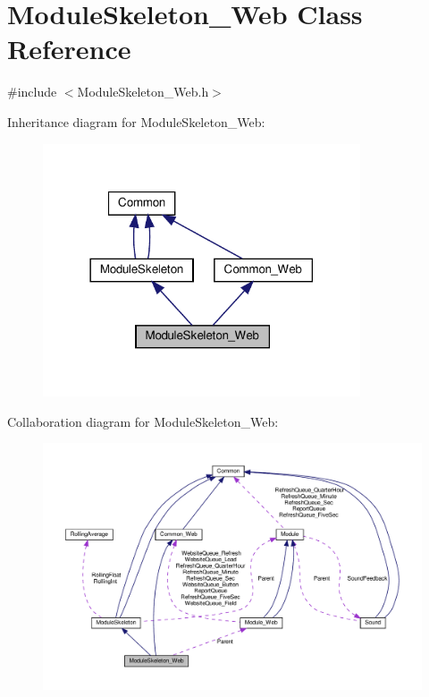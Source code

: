 \hypertarget{class_module_skeleton___web}{}\section{Module\+Skeleton\+\_\+\+Web Class Reference}
\label{class_module_skeleton___web}


{\ttfamily \#include $<$Module\+Skeleton\+\_\+\+Web.\+h$>$}



Inheritance diagram for Module\+Skeleton\+\_\+\+Web\+:
\nopagebreak
\begin{figure}[H]
\begin{center}
\leavevmode
\includegraphics[width=266pt]{class_module_skeleton___web__inherit__graph}
\end{center}
\end{figure}


Collaboration diagram for Module\+Skeleton\+\_\+\+Web\+:
\nopagebreak
\begin{figure}[H]
\begin{center}
\leavevmode
\includegraphics[width=350pt]{class_module_skeleton___web__coll__graph}
\end{center}
\end{figure}
